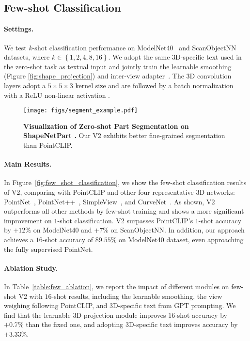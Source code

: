 \documentclass[10pt,twocolumn,letterpaper]{article}
\begin{document}
\subsection{Few-shot Classification}

\paragraph{Settings.} We test $k$-shot classification performance on ModelNet40~\cite{wu20153d} and ScanObjectNN~\cite{uy2019revisiting} datasets, where $k \in \left \{1,2,4,8,16 \right \}$. We adopt the same 3D-specific text used in the zero-shot task as textual input and jointly train the learnable smoothing (Figure \ref{fig:shape_projection}) and inter-view adapter~\cite{zhang2022pointclip}.
 The 3D convolution layers adopt a $5\times5\times3$ kernel size and are followed by a batch normalization \cite{ioffe2015batch} with a ReLU non-linear activation \cite{nair2010rectified}.

\begin{figure}[t!]
\centering
\texttt{[image: figs/segment\_example.pdf]}
\vspace{0.1cm}
\caption{\textbf{Visualization of Zero-shot Part Segmentation on ShapeNetPart \cite{yi2016scalable}.} Our V2 exhibits better fine-grained segmentation than PointCLIP.}
\label{fig:segment_example}
\end{figure}

\vspace{-0.1cm}
\paragraph{Main Results.} 
In Figure~\ref{fig:few_shot_classification}, we show the few-shot classification results of V2, comparing with PointCLIP and other four representative 3D networks: PointNet~\cite {qi2016pointnet}, PointNet++~\cite{qi2017pointnet++}, SimpleView~\cite{goyal2021revisiting}, and CurveNet~\cite{Xiang2021Walk}. As shown, V2 outperforms all other methods by few-shot training and shows a more significant improvement on $1$-shot classification. V2 surpasses PointCLIP's $1$-shot accuracy by $+12$\% on ModelNet40 and $+7$\% on ScanObjectNN. In addition, our approach achieves a $16$-shot accuracy of $89.55\%$ on ModelNet40 dataset, even approaching the fully supervised PointNet\cite{qi2016pointnet}.

\vspace{-0.1cm}
\paragraph{Ablation Study. }
In Table~\ref{table:few_ablation}, we report the impact of different modules on few-shot V2 with $16$-shot results, including the learnable smoothing, the view weighing following PointCLIP, and 3D-specific text from GPT prompting.
We find that the learnable 3D projection module improves $16$-shot accuracy by $+0.7\%$ than the fixed one, and adopting 3D-specific text improves accuracy by $+3.33\%$. 
\end{document}
